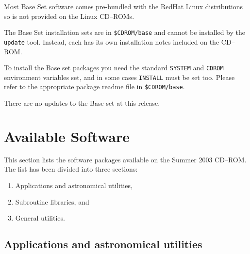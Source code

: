 \documentclass[twoside,11pt]{article}
\newcommand{\xlabel}[1]{}
\renewcommand{\_}{\texttt{\symbol{95}}}
\newcommand{\cdrom}{CD--ROM}
\newcommand{\cdrom}{CD-ROM}
\newcommand{\cdroms}{CD--ROMs}
\newcommand{\cdroms}{CD-ROMs}
\begin{document}
Most Base Set software comes pre-bundled with the RedHat Linux
distributions so is not provided on the Linux \cdroms.

The Base Set installation sets are in \texttt{\$CDROM/base} and cannot
be installed by the \texttt{update} tool.  Instead, each has its own
installation notes included on the \cdrom.

To install the Base set packages you need the standard \texttt{SYSTEM}
and \texttt{CDROM} environment variables set, and in some cases 
\texttt{INSTALL} must be set too.  Please refer to the appropriate 
package readme file in \texttt{\$CDROM/base}.

There are no updates to the Base set at this release.

\newpage
\appendix

\section{\xlabel{available_software}Available Software}
\label{available_software}

This section lists the software packages available on the Summer 2003 \cdrom. 
The list has been divided into three sections:

\begin{enumerate}
\item Applications and astronomical utilities,
\item Subroutine libraries, and
\item General utilities.
\end{enumerate}

\subsection{\xlabel{applications_and_astronomical_utilities}Applications and astronomical utilities}
\label{applications_and_astronomical_utilities}
\end{document}

